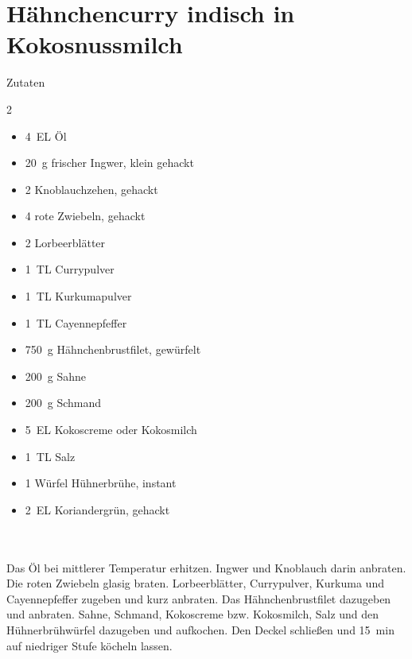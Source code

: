 \section*{Hähnchencurry indisch in Kokosnussmilch}
\ihead{}\ohead{}
\cfoot{}
{\Large Zutaten}
\begin{multicols}{2}
\begin{itemize}
\item \SI{4}{EL} Öl
\item \SI{20}{g} frischer Ingwer, klein gehackt
\item \num{2} Knoblauchzehen, gehackt
\item \num{4} rote Zwiebeln, gehackt
\item \num{2} Lorbeerblätter
\item \SI{1}{TL} Currypulver
\item \SI{1}{TL} Kurkumapulver
\item \SI{1}{TL} Cayennepfeffer
\item \SI{750}{g} Hähnchenbrustfilet, gewürfelt
\item \SI{200}{g} Sahne
\item \SI{200}{g} Schmand
\item \SI{5}{EL} Kokoscreme oder Kokosmilch
\item \SI{1}{TL} Salz
\item \num{1} Würfel Hühnerbrühe, instant
\item \SI{2}{EL} Koriandergrün, gehackt
\end{itemize}
\end{multicols}
\\
\\
Das Öl bei mittlerer Temperatur erhitzen.
Ingwer und Knoblauch darin anbraten.
Die roten Zwiebeln glasig braten.
Lorbeerblätter, Currypulver, Kurkuma und Cayennepfeffer zugeben und kurz anbraten.
Das Hähnchenbrustfilet dazugeben und anbraten.
Sahne, Schmand, Kokoscreme bzw. Kokosmilch, Salz und den Hühnerbrühwürfel dazugeben und aufkochen.
Den Deckel schließen und \SI{15}{min} auf niedriger Stufe köcheln lassen.
